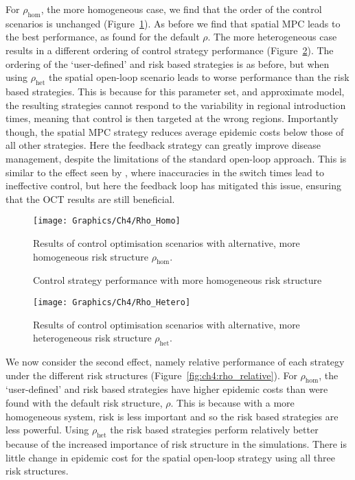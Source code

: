 For $\rho_{\mathrm{hom}}$, the more homogeneous case, we find that the order of the control scenarios is unchanged (Figure~\ref{fig:ch4:rho_homo}). As before we find that spatial MPC leads to the best performance, as found for the default $\rho$. The more heterogeneous case results in a different ordering of control strategy performance (Figure~\ref{fig:ch4:rho_hetero}). The ordering of the `user-defined' and risk based strategies is as before, but when using $\rho_{\mathrm{het}}$ the spatial open-loop scenario leads to worse performance than the risk based strategies. This is because for this parameter set, and approximate model, the resulting strategies cannot respond to the variability in regional introduction times, meaning that control is then targeted at the wrong regions. Importantly though, the spatial MPC strategy reduces average epidemic costs below those of all other strategies. Here the feedback strategy can greatly improve disease management, despite the limitations of the standard open-loop approach. This is similar to the effect seen by \citet{forster_optimizing_2007}, where inaccuracies in the switch times lead to ineffective control, but here the feedback loop has mitigated this issue, ensuring that the OCT results are still beneficial.

\begin{figure}
    \begin{center}
        \texttt{[image: Graphics/Ch4/Rho\_Homo]}
        \caption{Control strategy performance with more homogeneous risk structure}{Results of control optimisation scenarios with alternative, more homogeneous risk structure $\rho_{\mathrm{hom}}$.}
        \label{fig:ch4:rho_homo}
    \end{center}
\end{figure}

\begin{figure}
    \begin{center}
        \texttt{[image: Graphics/Ch4/Rho\_Hetero]}
        \caption[Control strategy performance with more heterogeneous risk structure]{Results of control optimisation scenarios with alternative, more heterogeneous risk structure $\rho_{\mathrm{het}}$.}
        \label{fig:ch4:rho_hetero}
    \end{center}
\end{figure}

We now consider the second effect, namely relative performance of each strategy under the different risk structures (Figure~\ref{fig:ch4:rho_relative}). For $\rho_{\mathrm{hom}}$, the `user-defined' and risk based strategies have higher epidemic costs than were found with the default risk structure, $\rho$. This is because with a more homogeneous system, risk is less important and so the risk based strategies are less powerful. Using $\rho_{\mathrm{het}}$ the risk based strategies perform relatively better because of the increased importance of risk structure in the simulations. There is little change in epidemic cost for the spatial open-loop strategy using all three risk structures.

